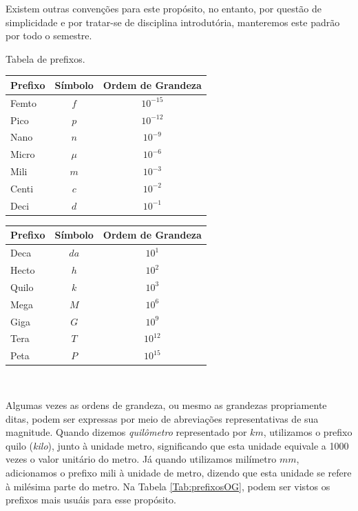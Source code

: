 \documentclass[a4paper, 11pt]{report}
\begin{document}
Existem outras convenções para este propósito, no entanto, por questão de 
simplicidade e por tratar-se de disciplina introdutória, manteremos este padrão
por todo o semestre. 

\begin{statictable}
    \caption{Tabela de prefixos.}
    \label{Tab:prefixosOG}
    \begin{tabular}{lcc}
        \textbf{Prefixo} & \textbf{Símbolo} & \textbf{Ordem de Grandeza} \\
        \hline
        Femto	& $f$	& $10^{-15}$ \\
        Pico	& $p$	& $10^{-12}$ \\
        Nano	& $n$	& $10^{-9}$ \\
        Micro	& $\mu$	& $10^{-6}$ \\
        Mili	& $m$	& $10^{-3}$ \\
        Centi	& $c$	& $10^{-2}$ \\
        Deci	& $d$	& $10^{-1}$ \\
        \hline
    \end{tabular}
    \begin{tabular}{lcc}
        \textbf{Prefixo} & \textbf{Símbolo} & \textbf{Ordem de Grandeza} \\
        \hline
        Deca	& $da$	& $10^{1}$ \\
        Hecto	& $h$	& $10^{2}$ \\
        Quilo	& $k$	& $10^{3}$ \\
        Mega	& $M$	& $10^{6}$ \\
        Giga	& $G$	& $10^{9}$ \\
        Tera	& $T$	& $10^{12}$ \\   
        Peta    & $P$   & $10^{15}$ \\
        \hline
    \end{tabular}\\
\end{statictable}

Algumas vezes as ordens de grandeza, ou mesmo as grandezas propriamente ditas, 
podem ser expressas por meio de abreviações representativas de sua magnitude. 
Quando dizemos \emph{quilômetro} representado por $km$, utilizamos o prefixo 
quilo (\emph{kilo}), junto à unidade metro, significando que esta unidade 
equivale a 1000 vezes o valor unitário do metro. Já quando utilizamos milímetro
$mm$, adicionamos o prefixo mili à unidade de metro, dizendo que esta unidade se
refere à milésima parte do metro. Na Tabela \ref{Tab:prefixosOG}, podem ser 
vistos os prefixos mais usuáis para esse propósito.
\end{document}
